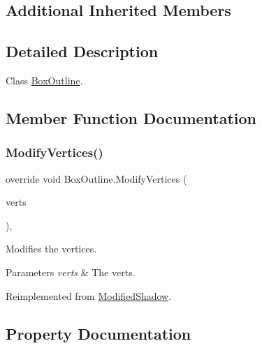 \subsection*{Additional Inherited Members}


\subsection{Detailed Description}
Class \hyperlink{class_box_outline}{Box\+Outline}. 



\subsection{Member Function Documentation}
\mbox{\label{class_box_outline_a2f73aa9d45a23d039aeff7a33a322019}} 
\subsubsection{\texorpdfstring{Modify\+Vertices()}{ModifyVertices()}}
{\footnotesize\ttfamily override void Box\+Outline.\+Modify\+Vertices (\begin{DoxyParamCaption}\item[{List$<$ U\+I\+Vertex $>$}]{verts }\end{DoxyParamCaption})\hspace{0.3cm}{\ttfamily [inline]}, {\ttfamily [virtual]}}



Modifies the vertices. 


\begin{DoxyParams}{Parameters}
{\em verts} & The verts.\\
\hline
\end{DoxyParams}


Reimplemented from \hyperlink{class_modified_shadow_ac1651effd229c1fd2f454eccc2cf225c}{Modified\+Shadow}.



\subsection{Property Documentation}
\mbox{\label{class_box_outline_a7a2b303e8572fffaf5384730964de22c}} 
